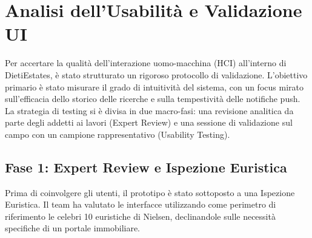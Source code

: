 \documentclass{article}
\begin{document}
\section{Analisi dell'Usabilità e Validazione UI}
Per accertare la qualità dell'interazione uomo-macchina (HCI) all'interno di DietiEstates, è stato strutturato un rigoroso protocollo di validazione. L'obiettivo primario è stato misurare il grado di intuitività del sistema, con un focus mirato sull'efficacia dello storico delle ricerche e sulla tempestività delle notifiche push. La strategia di testing si è divisa in due macro-fasi: una revisione analitica da parte degli addetti ai lavori (Expert Review) e una sessione di validazione sul campo con un campione rappresentativo (Usability Testing).

\subsection{Fase 1: Expert Review e Ispezione Euristica}
Prima di coinvolgere gli utenti, il prototipo è stato sottoposto a una Ispezione Euristica. Il team ha valutato le interfacce utilizzando come perimetro di riferimento le celebri 10 euristiche di Nielsen, declinandole sulle necessità specifiche di un portale immobiliare.
\end{document}
